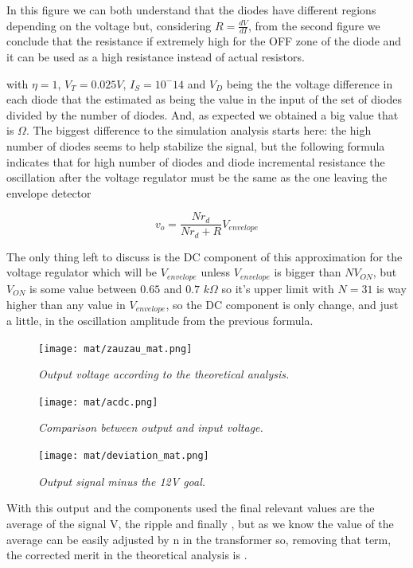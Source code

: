 In this figure we can both understand that the diodes have different regions depending on the voltage but, considering $R=\frac{dV}{dI}$, from the second figure we conclude that the resistance if extremely high for the OFF zone of the diode and it can be used as a high resistance instead of actual resistors.

with $\eta=1$, $V_T = 0.025V$, $I_S=10^-{14}$ and $V_D$ being the the voltage difference in each diode that the estimated as being the value in the input of the set of diodes divided by the number of diodes. And, as expected we obtained a big value that is $\Omega$. The biggest difference to the simulation analysis starts here: the high number of diodes seems to help stabilize the signal, but the following formula indicates that for high number of diodes and diode incremental resistance the oscillation after the voltage regulator must be the same as the one leaving the envelope detector

\begin{equation}
    v_o = \frac{N r_d}{N r_d + R}V_{envelope}
    \label{eq:v_o_mat}
\end{equation}

The only thing left to discuss is the DC component of this approximation for the voltage regulator which will be $V_{envelope}$ unless $V_{envelope}$ is bigger than $N V_{ON}$, but $V_{ON}$ is some value between $0.65$ and $0.7$ $k\Omega$ so it's upper limit with $N=31$ is way higher than any value in $V_{envelope}$, so the DC component is only change, and just a little, in the oscillation amplitude from the previous formula.


\begin{figure}[H]
    \centering
    \texttt{[image: mat/zauzau\_mat.png]}
        \caption{\textit{Output voltage according to the theoretical analysis.}}
    \label{fig:plot}
\end{figure}

\begin{figure}[H]
    \centering
    \texttt{[image: mat/acdc.png]}
        \caption{\textit{Comparison between output and input voltage.}}
    \label{fig:plot}
\end{figure}

\begin{figure}[H]
    \centering
    \texttt{[image: mat/deviation\_mat.png]}
        \caption{\textit{Output signal minus the 12V goal.}}
    \label{fig:plot}
\end{figure}

With this output and the components used the final relevant values are the average of the signal V, the ripple  and finally , but as we know the value of the average can be easily adjusted by n in the transformer so, removing that term, the corrected merit in the theoretical analysis is .